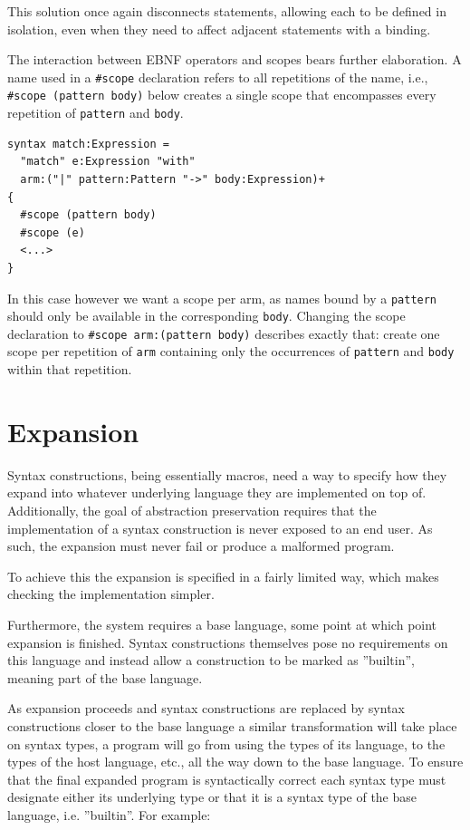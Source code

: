 \documentclass{kththesis}
\begin{document}
This solution once again disconnects statements, allowing each to be defined in isolation, even when they need to affect adjacent statements with a binding.

The interaction between EBNF operators and scopes bears further elaboration. A name used in a \texttt{#scope} declaration refers to all repetitions of the name, i.e., \texttt{#scope (pattern body)} below creates a single scope that encompasses every repetition of \texttt{pattern} and \texttt{body}.

\begin{verbatim}
syntax match:Expression =
  "match" e:Expression "with"
  arm:("|" pattern:Pattern "->" body:Expression)+
{
  #scope (pattern body)
  #scope (e)
  <...>
}
\end{verbatim}

In this case however we want a scope per arm, as names bound by a \texttt{pattern} should only be available in the corresponding \texttt{body}. Changing the scope declaration to \texttt{#scope arm:(pattern body)} describes exactly that: create one scope per repetition of \texttt{arm} containing only the occurrences of \texttt{pattern} and \texttt{body} within that repetition.

\section{Expansion} \label{sec:design-implementation}

Syntax constructions, being essentially macros, need a way to specify how they expand into whatever underlying language they are implemented on top of. Additionally, the goal of abstraction preservation requires that the implementation of a syntax construction is never exposed to an end user. As such, the expansion must never fail or produce a malformed program.

To achieve this the expansion is specified in a fairly limited way, which makes checking the implementation simpler.

Furthermore, the system requires a base language, some point at which point expansion is finished. Syntax constructions themselves pose no requirements on this language and instead allow a construction to be marked as ''builtin'', meaning part of the base language.

As expansion proceeds and syntax constructions are replaced by syntax constructions closer to the base language a similar transformation will take place on syntax types, a program will go from using the types of its language, to the types of the host language, etc., all the way down to the base language. To ensure that the final expanded program is syntactically correct each syntax type must designate either its underlying type or that it is a syntax type of the base language, i.e. ''builtin''. For example:
\end{document}
